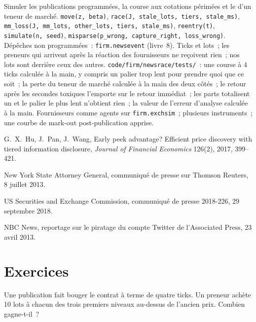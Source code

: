 \begin{build}
 Simuler les publications programmées, la course aux cotations périmées et le  d'un teneur de marché.
 \texttt{move(z, beta)}, \texttt{race(J, stale\_lots, tiers, stale\_ms)},
\texttt{mm\_loss(J, mm\_lots, other\_lots, tiers, stale\_ms)}, \texttt{reentry(t)}, \texttt{simulate(n, seed)}, \texttt{misparse(p\_wrong, capture\_right, loss\_wrong)}. Dépêches non programmées~:
\texttt{firm.newsevent} (livre~8).
 Ticks et lots~; les preneurs qui arrivent après la réaction des fournisseurs ne reçoivent rien~; nos lots sont derrière ceux des autres.
 \texttt{code/firm/newsrace/tests/}~: une course à 4 ticks calculée à la main, y compris un palier trop lent pour prendre quoi que ce soit~; la perte du
teneur de marché calculée à la main des deux côtés~; le retour après les secondes toxiques l'emporte sur le retour immédiat~; les parts totalisent un et le palier le plus lent n'obtient
rien~; la valeur de l'erreur d'analyse calculée à la main.
 Fournisseurs comme agents sur \texttt{firm.exchsim}~; plusieurs instruments~; une courbe de mark-out post-publication apprise.
\end{build}

\begin{omsources}
\item G.~X.~Hu, J.~Pan, J.~Wang, Early peek advantage? Efficient price discovery with tiered information disclosure, \emph{Journal of Financial
Economics} 126(2), 2017, 399--421.
\item New York State Attorney General, communiqué de presse sur Thomson Reuters, 8 juillet 2013.
\item US Securities and Exchange Commission, communiqué de presse 2018-226, 29 septembre 2018.
\item NBC News, reportage sur le piratage du compte Twitter de l'Associated Press, 23 avril 2013.
\end{omsources}

\section{Exercices}

\begin{exercise}[$\star$]\label{exo:hf:news-and-event-trading:1}
Une publication fait bouger le contrat à terme de quatre ticks. Un preneur achète 10 lots à chacun des trois premiers niveaux au-dessus de l'ancien prix. Combien gagne-t-il~?
\end{exercise}

